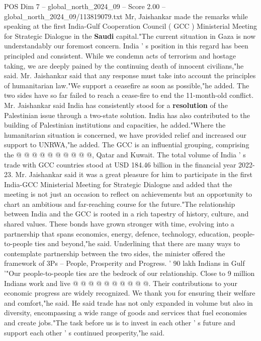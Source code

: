 \begin{textsample}{POS Dim 7 – global\_north\_2024\_09 – Score 2.00 – global\_north\_2024\_09/113819079.txt}  \label{ex:f7_pos_430}
Mr, Jaishankar made the remarks while speaking at the first India-Gulf Cooperation Council ( GCC ) Ministerial Meeting for Strategic Dialogue in the \textbf{Saudi} capital."The current situation in Gaza is now understandably our foremost concern.
India ' s position in this regard has been principled and consistent.
While we condemn acts of terrorism and hostage taking, we are deeply pained by the continuing death of innocent civilians,"he said.
Mr.
Jaishankar said that any response must take into account the principles of humanitarian law."We support a ceasefire as soon as possible,"he added.
The two sides have so far failed to reach a cease-fire to end the 11-month-old conflict.
Mr.
Jaishankar said India has consistently stood for a \textbf{resolution} of the Palestinian issue through a two-state solution.
India has also contributed to the building of Palestinian institutions and capacities, he added."Where the humanitarian situation is concerned, we have provided relief and increased our support to UNRWA,"he added.
The GCC is an influential grouping, comprising the @ @ @ @ @ @ @ @ @ @, Qatar and Kuwait.
The total volume of India ' s trade with GCC countries stood at USD 184.46 billion in the financial year 2022-23.
Mr.
Jaishankar said it was a great pleasure for him to participate in the first India-GCC Ministerial Meeting for Strategic Dialogue and added that the meeting is not just an occasion to reflect on achievements but an opportunity to chart an ambitious and far-reaching course for the future."The relationship between India and the GCC is rooted in a rich tapestry of history, culture, and shared values.
These bonds have grown stronger with time, evolving into a partnership that spans economics, energy, defence, technology, education, people-to-people ties and beyond,"he said.
Underlining that there are many ways to contemplate partnership between the two sides, the minister offered the framework of 3Ps -- People, Prosperity and Progress. ' 90 lakh Indians in Gulf '"Our people-to-people ties are the bedrock of our relationship.
Close to 9 million Indians work and live @ @ @ @ @ @ @ @ @ @.
Their contributions to your economic progress are widely recognized.
We thank you for ensuring their welfare and comfort,"he said.
He said trade has not only expanded in volume but also in diversity, encompassing a wide range of goods and services that fuel economies and create jobs."The task before us is to invest in each other ' s future and support each other ' s continued prosperity,"he said.

\end{textsample}
